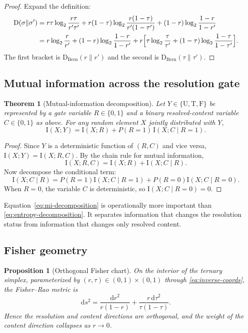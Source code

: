 \documentclass[11pt]{article}
\newtheorem{theorem}[definition]{Theorem}
\newtheorem{proposition}[definition]{Proposition}
\newcommand{\T}{\mathrm{T}}
\newcommand{\F}{\mathrm{F}}
\newcommand{\U}{\mathrm{U}}
\newcommand{\KL}{\mathrm{D}}
\newcommand{\MI}{\mathrm{I}}
\newcommand{\1}{\mathbf{1}}
\begin{document}
\begin{proof}
Expand the definition:
\begin{align*}
\KL(\sigma\|\sigma')
&=r\tau\log_2\frac{r\tau}{r'\tau'}
+r(1-\tau)\log_2\frac{r(1-\tau)}{r'(1-\tau')}
+(1-r)\log_2\frac{1-r}{1-r'}\\
&=r\log_2\frac{r}{r'}+(1-r)\log_2\frac{1-r}{1-r'}
+r\Bigl[\tau\log_2\frac{\tau}{\tau'}+(1-\tau)\log_2\frac{1-\tau}{1-\tau'}\Bigr].
\end{align*}
The first bracket is $\KL_{\mathrm{Bern}}(r\|r')$ and the second is $\KL_{\mathrm{Bern}}(\tau\|\tau')$.
\end{proof}

\subsection{Mutual information across the resolution gate}

\begin{theorem}[Mutual-information decomposition]
\label{thm:mi-decomposition}
Let $Y\in\{\U,\T,\F\}$ be represented by a gate variable $R\in\{0,1\}$ and a binary resolved-content variable $C\in\{0,1\}$ as above. For any random element $X$ jointly distributed with $Y$,
\begin{equation}
\MI(X;Y)=\MI(X;R)+P(R=1)\,\MI(X;C\mid R=1).
\label{eq:mi-decomposition}
\end{equation}
\end{theorem}

\begin{proof}
Since $Y$ is a deterministic function of $(R,C)$ and vice versa, $\MI(X;Y)=\MI(X;R,C)$. By the chain rule for mutual information,
\[
\MI(X;R,C)=\MI(X;R)+\MI(X;C\mid R).
\]
Now decompose the conditional term:
\[
\MI(X;C\mid R)=P(R=1)\MI(X;C\mid R=1)+P(R=0)\MI(X;C\mid R=0).
\]
When $R=0$, the variable $C$ is deterministic, so $\MI(X;C\mid R=0)=0$.
\end{proof}

Equation~\eqref{eq:mi-decomposition} is operationally more important than \eqref{eq:entropy-decomposition}. It separates information that changes the resolution status from information that changes only resolved content.

\subsection{Fisher geometry}

\begin{proposition}[Orthogonal Fisher chart]
\label{prop:fisher}
On the interior of the ternary simplex, parameterized by $(r,\tau)\in(0,1)\times(0,1)$ through \eqref{eq:inverse-coords}, the Fisher--Rao metric is
\begin{equation}
\mathrm{d}s^2
=
\frac{\mathrm{d}r^2}{r(1-r)}
+
\frac{r\,\mathrm{d}\tau^2}{\tau(1-\tau)}.
\label{eq:fisher-metric}
\end{equation}
Hence the resolution and content directions are orthogonal, and the weight of the content direction collapses as $r\to 0$.
\end{proposition}
\end{document}
